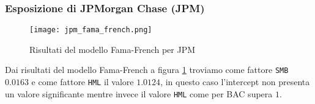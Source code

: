 \pagebreak

\subsubsection{Esposizione di JPMorgan Chase (JPM)}

\begin{figure}[ht]
    \centering
    \texttt{[image: jpm\_fama\_french.png]}
    \caption{Risultati del modello Fama-French per JPM}
    \label{fig:jpm_fama_french}
\end{figure}

Dai risultati del modello Fama-French a figura \ref{fig:jpm_fama_french} troviamo come fattore \verb|SMB| $0.0163$ e come fattore \verb|HML| il valore $1.0124$, 
in questo caso l'intercept non presenta un valore significante mentre invece il valore \verb|HML| come per BAC supera $1$.